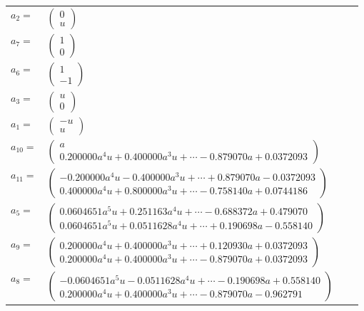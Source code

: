\documentclass[1p]{elsarticle_modified}
\theoremstyle{definition}
\begin{document}
\begin{tabular}{m{7pt} m{180pt} m{7pt} m{180pt} }
\flushright $a_{2}=$&$\begin{pmatrix}0\\u\end{pmatrix}$ \\
\flushright $a_{7}=$&$\begin{pmatrix}1\\0\end{pmatrix}$ \\
\flushright $a_{6}=$&$\begin{pmatrix}1\\-1\end{pmatrix}$ \\
\flushright $a_{3}=$&$\begin{pmatrix}u\\0\end{pmatrix}$ \\
\flushright $a_{1}=$&$\begin{pmatrix}- u\\u\end{pmatrix}$ \\
\flushright $a_{10}=$&$\begin{pmatrix}a\\0.200000 a^{4} u+0.400000 a^{3} u+\cdots-0.879070 a+0.0372093\end{pmatrix}$ \\
\flushright $a_{11}=$&$\begin{pmatrix}-0.200000 a^{4} u-0.400000 a^{3} u+\cdots+0.879070 a-0.0372093\\0.400000 a^{4} u+0.800000 a^{3} u+\cdots-0.758140 a+0.0744186\end{pmatrix}$ \\
\flushright $a_{5}=$&$\begin{pmatrix}0.0604651 a^{5} u+0.251163 a^{4} u+\cdots-0.688372 a+0.479070\\0.0604651 a^{5} u+0.0511628 a^{4} u+\cdots+0.190698 a-0.558140\end{pmatrix}$ \\
\flushright $a_{9}=$&$\begin{pmatrix}0.200000 a^{4} u+0.400000 a^{3} u+\cdots+0.120930 a+0.0372093\\0.200000 a^{4} u+0.400000 a^{3} u+\cdots-0.879070 a+0.0372093\end{pmatrix}$ \\
\flushright $a_{8}=$&$\begin{pmatrix}-0.0604651 a^{5} u-0.0511628 a^{4} u+\cdots-0.190698 a+0.558140\\0.200000 a^{4} u+0.400000 a^{3} u+\cdots-0.879070 a-0.962791\end{pmatrix}$ \\

\end{tabular}
\end{document}
